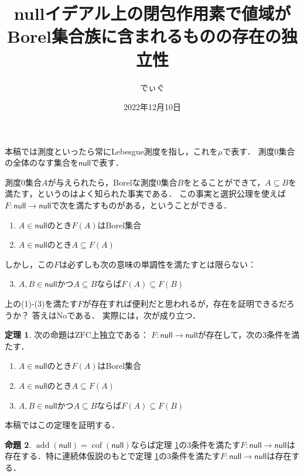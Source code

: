 \documentclass[uplatex,dvipdfmx]{jsarticle}
\title{nullイデアル上の閉包作用素で値域がBorel集合族に含まれるものの存在の独立性}
\author{でぃぐ}
\date{2022年12月10日}
\newcommand{\add}{\operatorname{add}}
\newcommand{\cof}{\operatorname{cof}}
\newcommand{\nul}{\mathsf{null}}
\newcommand{\ZFC}{\mathrm{ZFC}}
\renewcommand\subset{\subseteq}
\theoremstyle{definition}
\newtheorem{thm}{定理}
\newtheorem{prop}[thm]{命題}
\begin{document}
	\maketitle
	
	本稿では測度といったら常にLebesgue測度を指し，これを$\mu$で表す．
	測度$0$集合の全体のなす集合を$\nul$で表す．
	
	測度$0$集合$A$が与えられたら，Borelな測度$0$集合$B$をとることができて，$A \subset B$を満たす，というのはよく知られた事実である．
	この事実と選択公理を使えば$F \colon \nul \to \nul$で次を満たすものがある，ということができる．
	\begin{enumerate}
		\item $A \in \nul$のとき$F(A)$はBorel集合
		\item $A \in \nul$のとき$A \subset F(A)$
	\end{enumerate}
	しかし，この$F$は必ずしも次の意味の単調性を満たすとは限らない：
	\begin{enumerate}
	\setcounter{enumi}{2}
		\item $A, B \in \nul$かつ$A \subset B$ならば$F(A) \subset F(B)$
	\end{enumerate}
	上の(1)-(3)を満たす$F$が存在すれば便利だと思われるが，存在を証明できるだろうか？
	答えはNoである．
	実際には，次が成り立つ．
	
	\begin{thm}\label{thm:mainthm}
		次の命題は$\ZFC$上独立である：
		$F \colon \nul \to \nul$が存在して，次の3条件を満たす．
		\begin{enumerate}
			\item $A \in \nul$のとき$F(A)$はBorel集合
			\item $A \in \nul$のとき$A \subset F(A)$
			\item $A, B \in \nul$かつ$A \subset B$ならば$F(A) \subset F(B)$
		\end{enumerate}
	\end{thm}

	本稿ではこの定理を証明する．
	
	\begin{prop}\label{prop:ch}
		$\add(\nul) = \cof(\nul)$ならば定理 \ref{thm:mainthm}の3条件を満たす$F \colon \nul \to \nul$は存在する．特に連続体仮説のもとで定理 \ref{thm:mainthm}の3条件を満たす$F \colon \nul \to \nul$は存在する．
	\end{prop}
	
\end{document}
